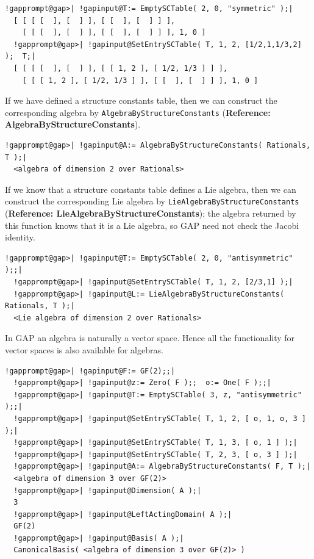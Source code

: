 \documentclass[a4paper,11pt]{report}
\begin{document}
{{ 
\begin{Verbatim}[commandchars=!@|,fontsize=\small,frame=single,label=Example]
  !gapprompt@gap>| !gapinput@T:= EmptySCTable( 2, 0, "symmetric" );|
  [ [ [ [  ], [  ] ], [ [  ], [  ] ] ],
    [ [ [  ], [  ] ], [ [  ], [  ] ] ], 1, 0 ]
  !gapprompt@gap>| !gapinput@SetEntrySCTable( T, 1, 2, [1/2,1,1/3,2] );  T;|
  [ [ [ [  ], [  ] ], [ [ 1, 2 ], [ 1/2, 1/3 ] ] ],
    [ [ [ 1, 2 ], [ 1/2, 1/3 ] ], [ [  ], [  ] ] ], 1, 0 ]
\end{Verbatim}
 

 If we have defined a structure constants table, then we can construct the
corresponding algebra by \texttt{AlgebraByStructureConstants} (\textbf{Reference: AlgebraByStructureConstants}). 

 
\begin{Verbatim}[commandchars=!@|,fontsize=\small,frame=single,label=Example]
  !gapprompt@gap>| !gapinput@A:= AlgebraByStructureConstants( Rationals, T );|
  <algebra of dimension 2 over Rationals>
\end{Verbatim}
 

 If we know that a structure constants table defines a Lie algebra, then we can
construct the corresponding Lie algebra by \texttt{LieAlgebraByStructureConstants} (\textbf{Reference: LieAlgebraByStructureConstants}); the algebra returned by this function knows that it is a Lie algebra, so \textsf{GAP} need not check the Jacobi identity. 

 
\begin{Verbatim}[commandchars=!@|,fontsize=\small,frame=single,label=Example]
  !gapprompt@gap>| !gapinput@T:= EmptySCTable( 2, 0, "antisymmetric" );;|
  !gapprompt@gap>| !gapinput@SetEntrySCTable( T, 1, 2, [2/3,1] );|
  !gapprompt@gap>| !gapinput@L:= LieAlgebraByStructureConstants( Rationals, T );|
  <Lie algebra of dimension 2 over Rationals>
\end{Verbatim}
 

 In \textsf{GAP} an algebra is naturally a vector space. Hence all the functionality for vector
spaces is also available for algebras. 

 
\begin{Verbatim}[commandchars=!@|,fontsize=\small,frame=single,label=Example]
  !gapprompt@gap>| !gapinput@F:= GF(2);;|
  !gapprompt@gap>| !gapinput@z:= Zero( F );;  o:= One( F );;|
  !gapprompt@gap>| !gapinput@T:= EmptySCTable( 3, z, "antisymmetric" );;|
  !gapprompt@gap>| !gapinput@SetEntrySCTable( T, 1, 2, [ o, 1, o, 3 ] );|
  !gapprompt@gap>| !gapinput@SetEntrySCTable( T, 1, 3, [ o, 1 ] );|
  !gapprompt@gap>| !gapinput@SetEntrySCTable( T, 2, 3, [ o, 3 ] );|
  !gapprompt@gap>| !gapinput@A:= AlgebraByStructureConstants( F, T );|
  <algebra of dimension 3 over GF(2)>
  !gapprompt@gap>| !gapinput@Dimension( A );|
  3
  !gapprompt@gap>| !gapinput@LeftActingDomain( A );|
  GF(2)
  !gapprompt@gap>| !gapinput@Basis( A );|
  CanonicalBasis( <algebra of dimension 3 over GF(2)> )
\end{Verbatim}
 

}}
\end{document}

